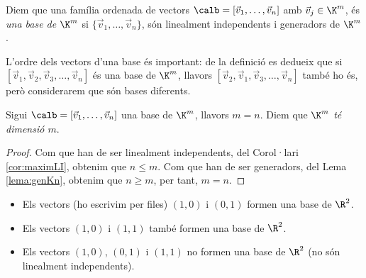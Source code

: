 \begin{definicio}\label{def:base}
	Diem que una família ordenada de vectors $\calb=[\vec  v_1, \dots, \vec v_n]$ amb $\vec v_j\in \K^m$, és \emph{una base de $\K^m$} si $\{\vec v_1,\dots,\vec v_n\}$, són linealment independents i generadors de $\K^m$.
\end{definicio}
\begin{observacio}
	L'ordre dels vectors d'una base és important: de la definició es dedueix que si $[\vec  v_1, \vec v_2, \vec v_3,\dots, \vec v_n]$ és una base de $\K^m$, llavors $[\vec  v_2, \vec v_1, \vec v_3,\dots, \vec v_n]$ també ho és, però considerarem que són bases diferents.
\end{observacio}

\begin{teorema}
	Sigui $\calb=[\vec v_1, \dots, \vec v_n]$ una base de $\K^m$, llavors $m=n$. Diem que \emph{$\K^m$ té dimensió $m$}.
\end{teorema}
\begin{proof}
    Com que han de ser linealment independents, del Corol·lari \ref{cor:maximLI}, obtenim que $n\leq m$. Com que han de ser generadors, del Lema \ref{lema:genKn}, obtenim que $n\geq m$, per tant, $m=n$.
\end{proof}

\begin{exemple}
	\begin{itemize}
		\item Els vectors (ho escrivim per files) $(1,0)$ i $(0,1)$ formen una base de $\R^2$.
		\item Els vectors $(1,0)$ i $(1,1)$ també formen una base de $\R^2$.
		\item Els vectors $(1,0)$, $(0,1)$ i $(1,1)$ no formen una base de $\R^2$ (no són linealment independents).
	\end{itemize}
\end{exemple}

